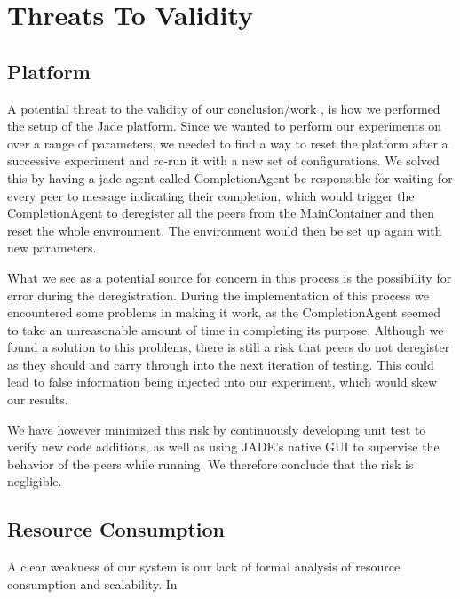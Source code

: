 \section{Threats To Validity}

\subsection{Platform}
A potential threat to the validity of our conclusion/work , is how we performed the setup of the Jade platform. Since we wanted to perform our experiments on over a range of parameters, we needed to find a way to reset the platform after a successive experiment and re-run it with a new set of configurations. We solved this by having a jade agent called CompletionAgent be responsible for waiting for every peer to message indicating their completion, which would trigger the CompletionAgent to deregister all the peers from the MainContainer and then reset the whole environment. The environment would then be set up again with new parameters. 

What we see as a potential source for concern in this process is the possibility for error during the deregistration. During the implementation of this process we encountered some problems in making it work, as the CompletionAgent seemed to take an unreasonable amount of time in completing its purpose. Although we found a solution to this problems, there is still a risk that peers do not deregister as they should and carry through into the next iteration of testing. This could lead to false information being injected into our experiment, which would skew our results.  

We have however minimized this risk by continuously developing unit test to verify new code additions, as well as using JADE's native GUI to supervise the behavior of the peers while running. We therefore conclude that the risk is negligible.

\subsection{Resource Consumption}
A clear weakness of our system is our lack of formal analysis of resource consumption and scalability. In 

